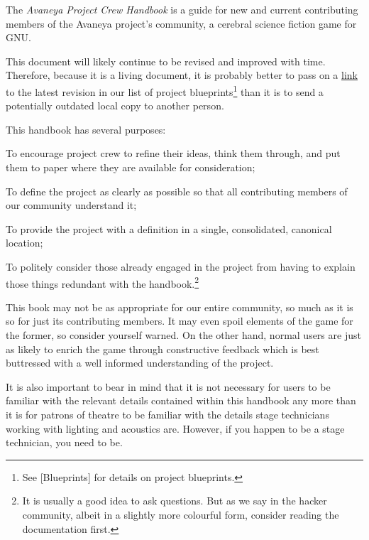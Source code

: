 

The {\it Avaneya Project Crew Handbook} is a guide for new and current contributing members of the Avaneya project's community, a cerebral science fiction game for GNU. 

This document will likely continue to be revised and improved with time. Therefore, because it is a living document, it is probably better to pass on a \href{\LatestHandbookURL}{link} to the latest revision in our list of project blueprints\footnote[]{See [Blueprints] for details on project blueprints.} than it is to send a potentially outdated local copy to another person.

This handbook has several purposes:

\startitemize[4]
\item
To encourage project crew to refine their ideas, think them through, and put them to paper where they are available for consideration;

\item
To define the project as clearly as possible so that all contributing members of our community understand it;

\item
To provide the project with a definition in a single, consolidated, canonical location;

\item
To politely consider those already engaged in the project from having to explain those things redundant with the handbook.\footnote[rtfm]{It is usually a good idea to ask questions. But as we say in the hacker community, albeit in a slightly more colourful form, consider reading the documentation first.}
\stopitemize

This book may not be as appropriate for our entire community, so much as it is so for just its contributing members. It may even spoil elements of the game for the former, so consider yourself warned. On the other hand, normal users are just as likely to enrich the game through constructive feedback which is best buttressed with a well informed understanding of the project.

It is also important to bear in mind that it is not necessary for users to be familiar with the relevant details contained within this handbook any more than it is for patrons of theatre to be familiar with the details stage technicians working with lighting and acoustics are. However, if you happen to be a stage technician, you need to be.

\StopChapter

